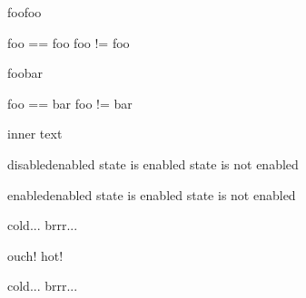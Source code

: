 \documentclass{article}
\begin{document}
\def\ifeqstr#1#2{%
  \def\stra{#1}%
  \def\strb{#2}%
  \ifx\stra\strb%
}

\ifeqstr{foo}{foo}
  foo == foo
\else
  foo != foo
\fi

\ifeqstr{foo}{bar}
  foo == bar
\else
  foo != bar
\fi

\def\macro{inner text}
\macro{}

\def\stateenabled{enabled}
\def\statedisabled{disabled}

\def\enablestate{%
  \let\state=\stateenabled%
}
\def\disablestate{%
  \let\state=\statedisabled%
}

\def\checkstateenabled{
  \ifx\state\stateenabled%
    state is enabled%
  \else%
    state is not enabled%
  \fi%
}

\disablestate
\checkstateenabled

\enablestate
\checkstateenabled

\newif\ifhot
\def\checkhot{
  \ifhot%
    ouch! hot!%
  \else%
    cold... brrr...%
  \fi%
}

\checkhot

\hottrue
\checkhot

\hotfalse
\checkhot
\end{document}
